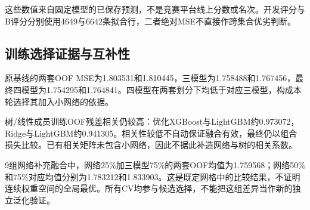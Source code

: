 这些数值来自固定模型的已保存预测，不是竞赛平台线上分数或名次。开发评分与B评分分别使用4649与6642条拟合行，二者绝对MSE不直接作跨集合优劣判断。

\subsection{训练选择证据与互补性}
原基线的两套OOF MSE为1.803531和1.810445，三模型为1.758488和1.767456，最终四模型为1.754295和1.764841。四模型在两套划分下均低于对应三模型，构成本轮选择其加入小网络的依据。

树/线性成员训练OOF残差相关仍较高：优化XGBoost与LightGBM约0.973072，Ridge与LightGBM约0.941305。相关性较低不自动保证融合有效，最终仍以组合损失比较。已有相关矩阵未包含小网络，因此不据此补造网络与树的相关系数。

9组网络补充融合中，网络25\%加三模型75\%的两套OOF均值为1.759568；网络50\%和75\%对应均值分别为1.783212和1.833903。这是既定网格中的比较结果，不证明连续权重空间的全局最优。所有CV均参与候选选择，不能把这组差异当作新的独立泛化验证。
